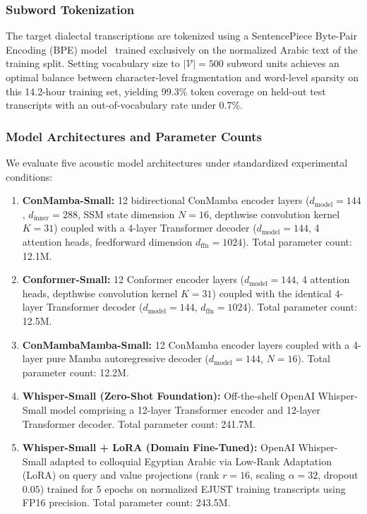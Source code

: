 \documentclass[journal]{IEEEtran}
\begin{document}
\subsubsection{Subword Tokenization}
The target dialectal transcriptions are tokenized using a SentencePiece Byte-Pair Encoding (BPE) model~\cite{sennrich2016subword,kudo2018sentencepiece} trained exclusively on the normalized Arabic text of the training split. Setting vocabulary size to $|\mathcal{V}| = 500$ subword units achieves an optimal balance between character-level fragmentation and word-level sparsity on this 14.2-hour training set, yielding 99.3\% token coverage on held-out test transcripts with an out-of-vocabulary rate under 0.7\%.

\subsubsection{Model Architectures and Parameter Counts}
We evaluate five acoustic model architectures under standardized experimental conditions:
\begin{enumerate}
    \item \textbf{ConMamba-Small:} 12 bidirectional ConMamba encoder layers ($d_{\text{model}} = 144$, $d_{\text{inner}} = 288$, SSM state dimension $N=16$, depthwise convolution kernel $K=31$) coupled with a 4-layer Transformer decoder ($d_{\text{model}} = 144$, 4 attention heads, feedforward dimension $d_{\text{ffn}} = 1024$). Total parameter count: 12.1M.
    \item \textbf{Conformer-Small:} 12 Conformer encoder layers ($d_{\text{model}} = 144$, 4 attention heads, depthwise convolution kernel $K=31$) coupled with the identical 4-layer Transformer decoder ($d_{\text{model}} = 144$, $d_{\text{ffn}} = 1024$). Total parameter count: 12.5M.
    \item \textbf{ConMambaMamba-Small:} 12 ConMamba encoder layers coupled with a 4-layer pure Mamba autoregressive decoder ($d_{\text{model}} = 144$, $N=16$). Total parameter count: 12.2M.
    \item \textbf{Whisper-Small (Zero-Shot Foundation):} Off-the-shelf OpenAI Whisper-Small model comprising a 12-layer Transformer encoder and 12-layer Transformer decoder. Total parameter count: 241.7M.
    \item \textbf{Whisper-Small + LoRA (Domain Fine-Tuned):} OpenAI Whisper-Small adapted to colloquial Egyptian Arabic via Low-Rank Adaptation (LoRA) on query and value projections (rank $r=16$, scaling $\alpha=32$, dropout $0.05$) trained for 5 epochs on normalized EJUST training transcripts using FP16 precision. Total parameter count: 243.5M.
\end{enumerate}
\end{document}

